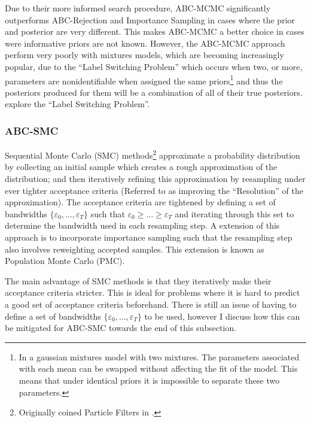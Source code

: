 \documentclass[11pt,a4paper]{article}
\theoremstyle{break}
\begin{document}
  \par Due to their more informed search procedure, ABC-MCMC significantly outperforms ABC-Rejection and Importance Sampling in cases where the prior and posterior are very different. This makes ABC-MCMC a better choice in cases were informative priors are not known. However, the ABC-MCMC approach perform very poorly with mixtures models, which are becoming increasingly popular, due to the ``Label Switching Problem'' \cite[]{mcmc_methods_and_the_label_switching_problem_in_bayesian_mixture_modeling} which occurs when two, or more, parameters are nonidentifiable when assigned the same priors\footnote{In a gaussian mixtures model with two mixtures. The parameters associated with each mean can be swapped without affecting the fit of the model. This means that under identical priors it is impossible to separate these two parameters.} and thus the posteriors produced for them will be a combination of all of their true posteriors. \cite[]{mcmc_methods_and_the_label_switching_problem_in_bayesian_mixture_modeling} explore the ``Label Switching Problem''.

\subsubsection{ABC-SMC}\label{sec_abc_smc}

  \par Sequential Monte Carlo (SMC) methods\footnote{Originally coined Particle Filters in \cite[]{non_linear_filtering_interacting_particle_resolution}.} approximate a probability distribution by collecting an initial sample which creates a rough approximation of the distribution; and then iteratively refining this approximation by resampling under ever tighter acceptance criteria (Referred to as improving the ``Resolution'' of the approximation). The acceptance criteria are tightened by defining a set of bandwidths $\{\varepsilon_0,\dots,\varepsilon_T\}$ such that $\varepsilon_0\geq\dots\geq\varepsilon_T$ and iterating through this set to determine the bandwidth used in each resampling step. A extension of this approach is to incorporate importance sampling such that the resampling step also involves reweighting accepted samples. This extension is known as Population Monte Carlo (PMC).

  \par The main advantage of SMC methods is that they iteratively make their acceptance criteria stricter. This is ideal for problems where it is hard to predict a good set of acceptance criteria beforehand. There is still an issue of having to define a set of bandwidths $\{\varepsilon_0,\dots,\varepsilon_T\}$ to be used, however I discuss how this can be mitigated for ABC-SMC towards the end of this subsection.
\end{document}

